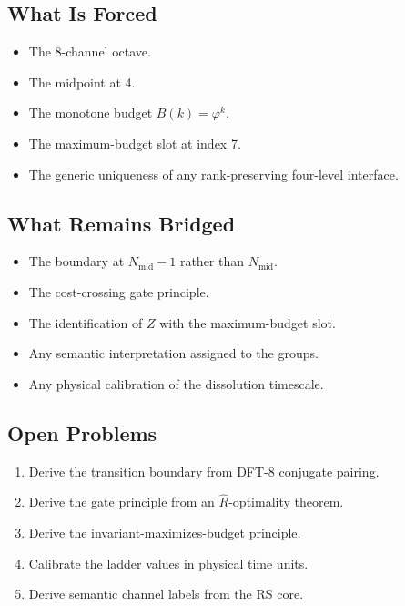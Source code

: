 \documentclass[11pt,a4paper]{article}
\theoremstyle{definition}
\newcommand{\phig}{\varphi}
\newcommand{\Rhat}{\hat{R}}
\newcommand{\Zp}{Z}
\begin{document}
\subsection{What Is Forced}

\begin{itemize}
\item The 8-channel octave.
\item The midpoint at 4.
\item The monotone budget $B(k)=\phig^k$.
\item The maximum-budget slot at index 7.
\item The generic uniqueness of any rank-preserving four-level interface.
\end{itemize}

\subsection{What Remains Bridged}

\begin{itemize}
\item The boundary at $N_{\mathrm{mid}}-1$ rather than $N_{\mathrm{mid}}$.
\item The cost-crossing gate principle.
\item The identification of $\Zp$ with the maximum-budget slot.
\item Any semantic interpretation assigned to the groups.
\item Any physical calibration of the dissolution timescale.
\end{itemize}

\subsection{Open Problems}

\begin{enumerate}
\item Derive the transition boundary from DFT-8 conjugate pairing.
\item Derive the gate principle from an $\Rhat$-optimality theorem.
\item Derive the invariant-maximizes-budget principle.
\item Calibrate the ladder values in physical time units.
\item Derive semantic channel labels from the RS core.
\end{enumerate}

\end{document}

